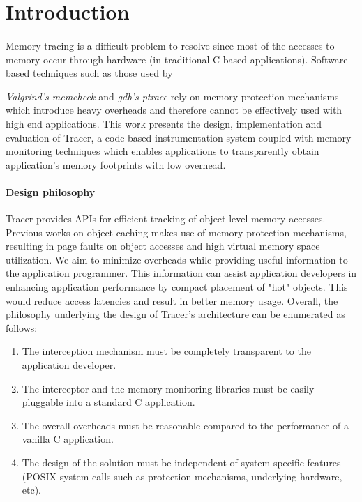 \section{Introduction} 
\label{sec:intro}
\paragraph{}
Memory tracing is a difficult problem to resolve since most of the accesses to memory occur through hardware (in traditional C based applications). Software based techniques such as those used by {\emph{Valgrind's memcheck \cite{Valgrind}} and {\emph{gdb's ptrace}} \cite{gdb} rely on memory protection mechanisms which introduce heavy overheads and therefore cannot be effectively used with high end applications. This work presents the design, implementation and evaluation of Tracer, a code based instrumentation system coupled with memory monitoring techniques which enables applications to transparently obtain application's memory footprints with low overhead. 

\paragraph{Design philosophy}
Tracer provides APIs for efficient tracking of object-level memory accesses. Previous works on object caching makes use of memory protection mechanisms, resulting in page faults on object accesses and high virtual memory space utilization. We aim to minimize overheads while providing useful information to the application programmer. This information can assist application developers in enhancing application performance by compact placement of "hot" objects. This would reduce access latencies and result in better memory usage. Overall, the philosophy underlying the design of Tracer's architecture can be enumerated as follows:
\begin{enumerate}
\item The interception mechanism must be completely transparent to the application developer.
\item The interceptor and the memory monitoring libraries must be easily pluggable into a standard C application.
\item The overall overheads must be reasonable compared to the performance of a vanilla C application.
\item The design of the solution must be independent of system specific features (POSIX system calls such as protection mechanisms, underlying hardware, etc).
\end{enumerate}

}
